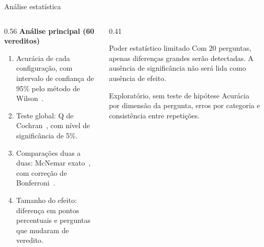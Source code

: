 \documentclass[aspectratio=169,10pt]{beamer}
\begin{document}
\begin{frame}{Análise estatística}
  \begin{columns}[T,onlytextwidth]
    \begin{column}{0.56\textwidth}
      \textbf{\color{UnBAzul}Análise principal (60 vereditos)}
      \begin{enumerate}
        \item Acurácia de cada configuração, com intervalo de confiança de 95\% pelo método de Wilson~\cite{wilson1927}.
        \item Teste global: Q de Cochran~\cite{cochran1950}, com nível de significância de 5\%.
        \item Comparações duas a duas: McNemar exato~\cite{mcnemar1947}, com correção de Bonferroni~\cite{dunn1961}.
        \item Tamanho do efeito: diferença em pontos percentuais e perguntas que mudaram de veredito.
      \end{enumerate}
    \end{column}
    \begin{column}{0.41\textwidth}
      \begin{alertblock}{Poder estatístico limitado}
        \small
        Com 20 perguntas, apenas diferenças grandes serão detectadas.
        A ausência de significância não será lida como ausência de efeito.
      \end{alertblock}
      \vspace{1mm}
      \begin{exampleblock}{Exploratório, sem teste de hipótese}
        \small
        Acurácia por dimensão da pergunta, erros por categoria e consistência entre repetições.
      \end{exampleblock}
    \end{column}
  \end{columns}
\end{frame}
\end{document}
